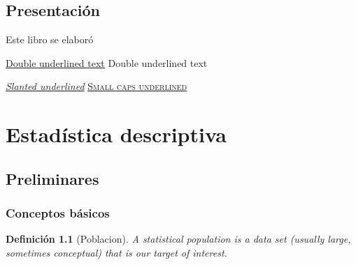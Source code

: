 \documentclass[a4paper]{report}
\newtheorem{defn}[thm]{Definición}
\begin{document}
\renewcommand\listfigurename{Lista de figuras}
\listoffigures

\renewcommand\listtablename{Lista de tablas}
\listoftables
\newpage

\clearpage

\chapter*{Presentación}

Este libro se elaboró


\underline{\underline{Double underlined text}}
{Double underlined text}

\textsl{\underline{Slanted underlined}}
\textsc{\underline{Small caps underlined}}








\part{Estadística descriptiva}
\setcounter{page}{1}

\chapter{Preliminares}

\section{Conceptos básicos}

\begin{defn}[Poblacion]
	A statistical population is a data set (usually large, sometimes conceptual) that is our target of interest.
\end{defn}
\end{document}
